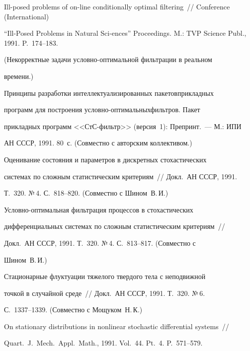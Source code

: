 Ill-posed problems of on-line conditionally optimal filtering~// Conference (International)


``Ill-Posed Problems in Natural Sci-\linebreak ences'' Proceedings. M.: TVP Science Publ., 1991. P.~174--183.


(Некорректные задачи условно-оптимальной фильтрации в реальном


времени.)





 Принципы разработки интеллектуализированных пакетов\linebreak прикладных


программ для построения условно-оптимальных\linebreak фильтров. Пакет


прикладных программ <<СтС-фильтр>> (версия~1): Препринт.~--- М.: ИПИ


АН СССР, 1991. 80~с. (Совместно с авторским коллективом.)





 Оценивание состояния и параметров в дискретных стохастических


системах по сложным статистическим критериям~// Докл.\ АН СССР, 1991.


Т.~320. №\,4. С.~818--820. (Совместно с Шином~В.\,И.)





 Условно-оптимальная фильтрация процессов в стохастических


дифференциальных системах по сложным статистическим критериям~//


Докл.\ АН СССР, 1991. Т.~320. №\,4. С.~813--817. (Совместно с


Шином~В.\,И.)





 Стационарные флуктуации тяжелого твердого тела с неподвижной


точкой в случайной среде~// Докл.\ АН СССР, 1991. Т.~320. №\,6.


 С.~1337--1339. (Совместно с Мощуком~Н.\,К.)





 On stationary distributions in nonlinear stochastic differential systems~//


 Quart.\ J.\ Mech.\ Appl.\ Math., 1991. Vol.~44. Pt.~4. P.~571--579.


